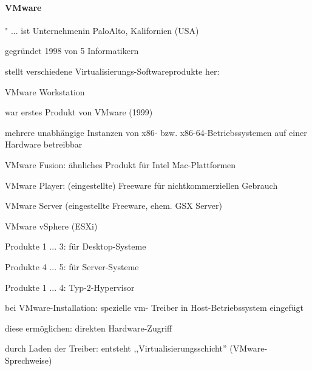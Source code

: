 \documentclass[a4paper]{article}
\begin{document}
\begin{multicols}{3}
    \paragraph{VMware}

    \begin{itemize*}
        \item " ... ist Unternehmenin PaloAlto, Kalifornien (USA)
        \item gegründet 1998 von 5 Informatikern
        \item stellt verschiedene Virtualisierungs-Softwareprodukte her:
        \begin{enumerate*}

            \item VMware Workstation \begin{itemize*} \item war erstes Produkt von VMware (1999) \item mehrere unabhängige Instanzen von x86- bzw. x86-64-Betriebssystemen auf einer Hardware betreibbar \end{itemize*}
            \item VMware Fusion: ähnliches Produkt für Intel Mac-Plattformen
            \item VMware Player: (eingestellte) Freeware für nichtkommerziellen Gebrauch
            \item VMware Server (eingestellte Freeware, ehem. GSX Server)
            \item VMware vSphere (ESXi) \begin{itemize*} \item Produkte 1 ... 3: für Desktop-Systeme \item Produkte 4 ... 5: für Server-Systeme \item Produkte 1 ... 4: Typ-2-Hypervisor \end{itemize*}
        \end{enumerate*}
        \item bei VMware-Installation: spezielle vm- Treiber in Host-Betriebssystem
        eingefügt
        \item diese ermöglichen: direkten Hardware-Zugriff
        \item durch Laden der Treiber: entsteht ,,Virtualisierungsschicht''
        (VMware-Sprechweise)

\end{itemize*}
\end{multicols}
\end{document}
